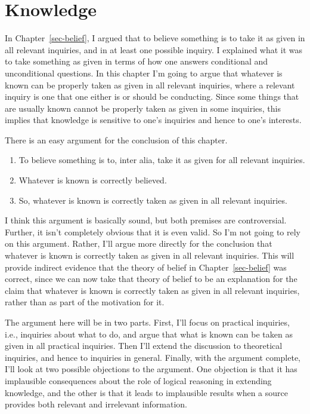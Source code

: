 \documentclass[
  10pt,
  letterpaper,
  twoside]{scrbook}
\providecommand{\tightlist}{%
  \setlength{\itemsep}{0pt}\setlength{\parskip}{0pt}}\usepackage{longtable,booktabs,array}
\begin{document}

\chapter{Knowledge}\label{sec-knowledge}

In Chapter~\ref{sec-belief}, I argued that to believe something is to
take it as given in all relevant inquiries, and in at least one possible
inquiry. I explained what it was to take something as given in terms of
how one answers conditional and unconditional questions. In this chapter
I'm going to argue that whatever is known can be properly taken as given
in all relevant inquiries, where a relevant inquiry is one that one
either is or should be conducting. Since some things that are usually
known cannot be properly taken as given in some inquiries, this implies
that knowledge is sensitive to one's inquiries and hence to one's
interests.

There is an easy argument for the conclusion of this chapter.

\begin{enumerate}
\def\labelenumi{\arabic{enumi}.}
\tightlist
\item
  To believe something is to, inter alia, take it as given for all
  relevant inquiries.
\item
  Whatever is known is correctly believed.
\item
  So, whatever is known is correctly taken as given in all relevant
  inquiries.
\end{enumerate}

I think this argument is basically sound, but both premises are
controversial. Further, it isn't completely obvious that it is even
valid. So I'm not going to rely on this argument. Rather, I'll argue
more directly for the conclusion that whatever is known is correctly
taken as given in all relevant inquiries. This will provide indirect
evidence that the theory of belief in Chapter~\ref{sec-belief} was
correct, since we can now take that theory of belief to be an
explanation for the claim that whatever is known is correctly taken as
given in all relevant inquiries, rather than as part of the motivation
for it.

The argument here will be in two parts. First, I'll focus on practical
inquiries, i.e., inquiries about what to do, and argue that what is
known can be taken as given in all practical inquiries. Then I'll extend
the discussion to theoretical inquiries, and hence to inquiries in
general. Finally, with the argument complete, I'll look at two possible
objections to the argument. One objection is that it has implausible
consequences about the role of logical reasoning in extending knowledge,
and the other is that it leads to implausible results when a source
provides both relevant and irrelevant information.
\end{document}
